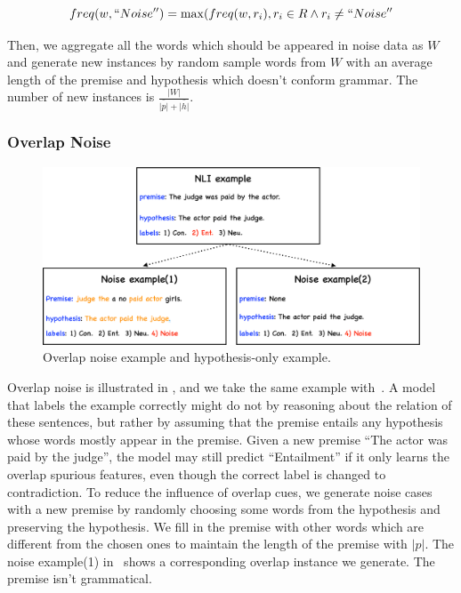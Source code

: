  \begin{equation}
    freq(w, ``Noise'') = \max(freq(w, r_{i}), r_{i}\in{R} \wedge r_{i}\neq{``Noise''}
\end{equation}

Then, we aggregate all the words which should be appeared in 
noise data as $W$ and generate new instances by random sample words from $W$ with 
an average length of the premise and hypothesis which doesn't conform grammar. 
The number of new instances is $\frac{|W|}{\bar{|p|}+\bar{|h|}}$.

\subsubsection{Overlap Noise}

\begin{figure}[th!]
	\centering
	\includegraphics[width=\columnwidth]{figures/noise.eps}
	\caption{Overlap noise example and hypothesis-only example.}
\label{fig:noise2and3}
\end{figure}

Overlap noise is illustrated in , and 
we take the same example with~\cite{mccoy2019right}.
A model that labels the example correctly
might do not by reasoning about the relation
of these sentences, but rather by assuming that the
premise entails any hypothesis whose words mostly 
appear in the premise. Given a new premise ``The actor was paid by the judge'', 
the model may still predict ``Entailment'' if it only learns the overlap spurious features,
even though the correct label is changed to contradiction. 
To reduce the influence of overlap cues, we generate 
noise cases with a new premise by randomly choosing some words from the hypothesis and preserving the hypothesis. 
We fill in the premise with other words which are different from the chosen ones to maintain 
the length of the premise with $|p|$. The noise example(1) in~ shows 
a corresponding overlap instance we generate. The premise isn't grammatical.


